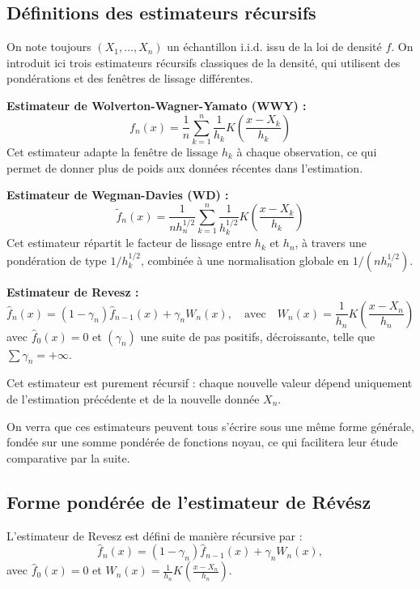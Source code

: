 \documentclass[12pt]{article}
\begin{document}
\subsection{Définitions des estimateurs récursifs}

On note toujours \( (X_1, \dots, X_n) \) un échantillon i.i.d. issu de la loi de densité \( f \). On introduit ici trois estimateurs récursifs classiques de la densité, qui utilisent des pondérations et des fenêtres de lissage différentes.

\vspace{1em}
\noindent\textbf{Estimateur de Wolverton-Wagner-Yamato (WWY) :}
\[
f_n(x) = \frac{1}{n} \sum_{k=1}^{n} \frac{1}{h_k} K\left( \frac{x - X_k}{h_k} \right)
\]
Cet estimateur adapte la fenêtre de lissage \( h_k \) à chaque observation, ce qui permet de donner plus de poids aux données récentes dans l'estimation.


\vspace{1em}
\noindent\textbf{Estimateur de Wegman-Davies (WD) :}
\[
\tilde{f}_n(x) = \frac{1}{n h_n^{1/2}} \sum_{k=1}^{n} \frac{1}{h_k^{1/2}} K\left( \frac{x - X_k}{h_k} \right)
\]
Cet estimateur répartit le facteur de lissage entre \( h_k \) et \( h_n \), à travers une pondération de type \( 1/h_k^{1/2} \), combinée à une normalisation globale en \( 1/(n h_n^{1/2}) \).


\vspace{1em}
\noindent\textbf{Estimateur de Revesz :}
\[
\hat{f}_n(x) = (1 - \gamma_n) \hat{f}_{n-1}(x) + \gamma_n W_n(x), \quad \text{avec} \quad W_n(x) = \frac{1}{h_n} K\left( \frac{x - X_n}{h_n} \right)
\]
avec \( \hat{f}_0(x) = 0 \) et \( (\gamma_n) \) une suite de pas positifs, décroissante, telle que \( \sum \gamma_n = +\infty \).

Cet estimateur est purement récursif : chaque nouvelle valeur dépend uniquement de l’estimation précédente et de la nouvelle donnée \( X_n \).

\vspace{1em}
On verra que ces estimateurs peuvent tous s’écrire sous une même forme générale, fondée sur une somme pondérée de fonctions noyau, ce qui facilitera leur étude comparative par la suite.

\subsection{Forme pondérée de l’estimateur de Révész}

L’estimateur de Revesz est défini de manière récursive par :
\[
\hat{f}_n(x) = (1 - \gamma_n) \hat{f}_{n-1}(x) + \gamma_n W_n(x),
\]
avec \( \hat{f}_0(x) = 0 \) et \( W_n(x) = \frac{1}{h_n} K\left( \frac{x - X_n}{h_n} \right) \).
\end{document}
